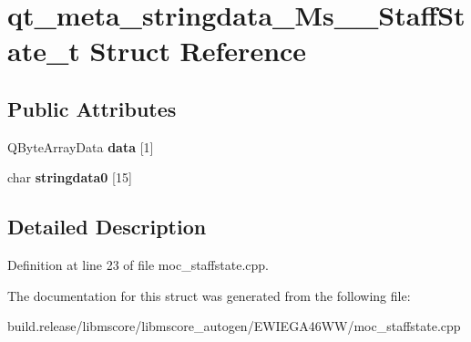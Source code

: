 \hypertarget{structqt__meta__stringdata___ms_____staff_state__t}{}\section{qt\+\_\+meta\+\_\+stringdata\+\_\+\+Ms\+\_\+\+\_\+\+Staff\+State\+\_\+t Struct Reference}
\label{structqt__meta__stringdata___ms_____staff_state__t}
\subsection*{Public Attributes}
\begin{DoxyCompactItemize}
\item 
\mbox{\label{structqt__meta__stringdata___ms_____staff_state__t_ad9cfa5f8edf7eea1c3d8214805e402c5}} 
Q\+Byte\+Array\+Data {\bfseries data} \mbox{[}1\mbox{]}
\item 
\mbox{\label{structqt__meta__stringdata___ms_____staff_state__t_a198bb35ef119ced4a34801beb48e2076}} 
char {\bfseries stringdata0} \mbox{[}15\mbox{]}
\end{DoxyCompactItemize}


\subsection{Detailed Description}


Definition at line 23 of file moc\+\_\+staffstate.\+cpp.



The documentation for this struct was generated from the following file\+:\begin{DoxyCompactItemize}
\item 
build.\+release/libmscore/libmscore\+\_\+autogen/\+E\+W\+I\+E\+G\+A46\+W\+W/moc\+\_\+staffstate.\+cpp\end{DoxyCompactItemize}
